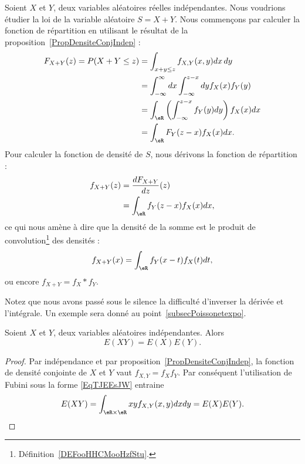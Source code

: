 Soient \( X\) et \( Y\), deux variables aléatoires réelles indépendantes. Nous voudrions étudier la loi de la variable aléatoire \( S=X+Y\). Nous commençons par calculer la fonction de répartition en utilisant le résultat de la proposition~\ref{PropDensiteConjIndep} :
\begin{subequations}
	\begin{align}
		F_{X+Y}(z)=P(X+Y\leq z) & =\int_{x+y\leq z}f_{X,Y}(x,y)dx\,dy                            \\
		                        & =\int_{-\infty}^{\infty}dx\int_{-\infty}^{z-x}dyf_X(x)f_Y(y)   \\
		                        & =\int_{\eR}\left( \int_{-\infty}^{z-x}f_Y(y)dy \right)f_X(x)dx \\
		                        & =\int_{\eR}F_Y(z-x)f_X(x)dx.
	\end{align}
\end{subequations}
Pour calculer la fonction de densité de \( S\), nous dérivons la fonction de répartition :
\begin{subequations}
	\begin{align}
		f_{X+Y}(z) & =\frac{ d F_{X+Y} }{ d z }(z) \\
		           & =\int_{\eR}f_Y(z-x)f_X(x)dx,
	\end{align}
\end{subequations}
ce qui nous amène à dire que la densité de la somme est le produit de convolution\footnote{Définition~\ref{DEFooHHCMooHzfStu}.} des densités :
\begin{equation}        \label{EQooFKHHooWvUBMV}
	f_{X+Y}(x)=\int_{\eR}f_Y(x-t)f_X(t)dt,
\end{equation}
ou encore \( f_{X+Y}=f_X* f_Y\).

Notez que nous avons passé sous le silence la difficulté d'inverser la dérivée et l'intégrale. Un exemple sera donné au point~\ref{subsecPoissonetexpo}.

\begin{lemma}       \label{LemEXYEXEYprodindep}
	Soient \( X\) et \( Y\), deux variables aléatoires indépendantes. Alors
	\begin{equation}
		E(XY)=E(X)E(Y).
	\end{equation}
\end{lemma}

\begin{proof}
	Par indépendance et par proposition~\ref{PropDensiteConjIndep}, la fonction de densité conjointe de \( X\) et \( Y\) vaut \( f_{X,Y}=f_Xf_Y\). Par conséquent l'utilisation de Fubini sous la forme \eqref{EqTJEEsJW} entraine
	\begin{equation}
		E(XY)=\int_{\eR\times\eR}xyf_{X,Y}(x,y)dxdy=E(X)E(Y).
	\end{equation}
\end{proof}

